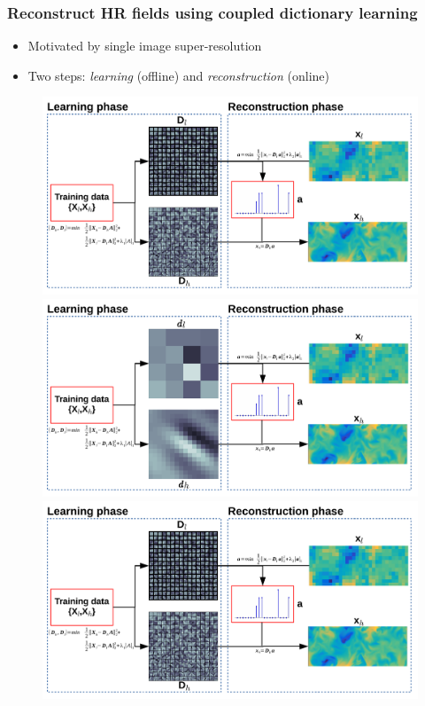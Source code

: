 \documentclass{beamer}
\let\olditem\item
\renewcommand{\item}{\setlength{\itemsep}{\fill}\olditem}
\begin{document}
\begin{frame}
	\frametitle{Reconstruct HR fields using coupled dictionary learning} 
	\begin{itemize} \itemsep0em
		\item Motivated by single image super-resolution {\footnotesize \cite{yang2010image}}
		\item Two steps: \emph{learning} (offline) and \emph{reconstruction} (online)
	\end{itemize}
	\vspace{-0.25cm}
	\begin{figure} 
		\begin{overprint}
			\centering
		\includegraphics[width=\textwidth]{./figures/DL/SR_skeme.pdf}
		\onslide<2>	\centering
		\includegraphics[width=\textwidth]{./figures/DL/SR_skeme_zoom.pdf}		
		\onslide<3>	\centering
		\includegraphics[width=\textwidth]{./figures/DL/SR_skeme.pdf}
		\end{overprint}
	\end{figure}
\end{frame}
\end{document}
